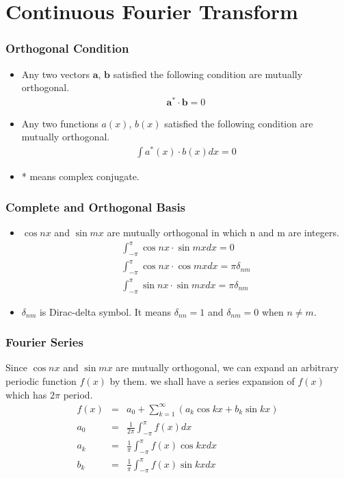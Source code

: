 \documentclass{beamer}
\begin{document}
\section{Continuous Fourier Transform}
\begin{frame}
\frametitle{Orthogonal Condition}
\begin{itemize}
\item Any two vectors $\mathbf{a}$, $\mathbf{b}$ satisfied the following condition are mutually orthogonal. \newline
\begin{eqnarray}
\mathbf{a}^* \cdot \mathbf{b} = 0
\label{eq:ortho_vec}
\end{eqnarray}
\item Any two functions $a(x)$, $b(x)$ satisfied the following condition are mutually orthogonal. \newline
\begin{eqnarray}
\int{a^*(x)} \cdot {b(x)} dx = 0
\label{eq:ortho_func}
\end{eqnarray}
\item * means complex conjugate. \newline
\end{itemize}
\end{frame}
\begin{frame}
\frametitle{Complete and Orthogonal Basis}
\begin{itemize}
\item $\cos nx $ and $\sin mx$ are mutually orthogonal in which n and m are integers.
\begin{eqnarray}
\int_{-\pi}^{\pi}{\cos nx} \cdot {\sin mx} dx = 0 \nonumber \\
\int_{-\pi}^{\pi}{\cos nx} \cdot {\cos mx} dx = \pi\delta_{nm} \nonumber \\
\int_{-\pi}^{\pi}{\sin nx} \cdot {\sin mx} dx = \pi\delta_{nm}
\end{eqnarray}
\item $\delta_{nm} $ is Dirac-delta symbol. It means $\delta_{nn} = 1$ and $\delta_{nm} = 0$ when $n \neq m$.
\end{itemize}
\end{frame}
\begin{frame}
\frametitle{Fourier Series}
Since $\cos nx $ and $\sin mx$ are mutually orthogonal, we can expand an arbitrary periodic function $f(x)$ by them. we shall have a series expansion of $f(x)$ which has $2\pi$ period.
\begin{eqnarray}
f(x)&=&a_0 + \sum_{k=1}^{\infty} \left(a_k\cos kx + b_k \sin kx\right) \nonumber \\
a_0&=&\frac{1}{2\pi}\int_{-\pi}^{\pi}f(x) dx \nonumber \\
a_k&=&\frac{1}{\pi}\int_{-\pi}^{\pi}f(x) \cos kx dx \nonumber \\
b_k&=&\frac{1}{\pi}\int_{-\pi}^{\pi}f(x) \sin kx dx
\label{eq:fseries}
\end{eqnarray}
\end{frame}
\end{document}

